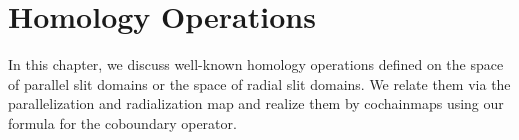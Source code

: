 \chapter{Homology Operations}
\label{homology_operations}

In this chapter, we discuss well-known homology operations defined on the space of parallel slit domains or the space of radial slit domains.
We relate them via the parallelization and radialization map
and realize them by cochainmaps using our formula for the coboundary operator.








